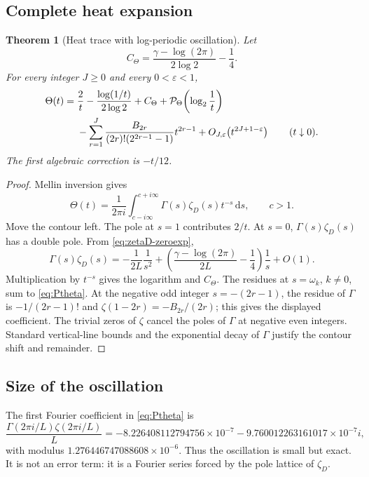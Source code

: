 \documentclass[11pt,oneside]{article}
\numberwithin{equation}{section}
\theoremstyle{plain}
\newtheorem{theorem}{Theorem}[section]
\theoremstyle{definition}
\theoremstyle{remark}
\newcommand{\dd}{\,\mathrm{d}}
\newcommand{\Pcal}{\mathcal P}
\begin{document}
\subsection{Complete heat expansion}

\begin{theorem}[Heat trace with log-periodic oscillation]\label{thm:heat}
Let
\begin{equation}\label{eq:Ctheta}
 C_\Theta=\frac{\gamma-\log(2\pi)}{2\log2}-\frac14.
\end{equation}
For every integer $J\ge0$ and every $0<\varepsilon<1$,
\begin{align}\label{eq:heat-asymp}
 \Theta(t)
 ={}&\frac2t-\frac{\log(1/t)}{2\log2}+C_\Theta
 +\Pcal_\Theta\!\left(\log_2\frac1t\right)\\
 &-\sum_{r=1}^{J}
 \frac{B_{2r}}{(2r)!(2^{2r-1}-1)}t^{2r-1}
 +O_{J,\varepsilon}\!\left(t^{2J+1-\varepsilon}\right)
 \qquad(t\downarrow0).\notag
\end{align}
The first algebraic correction is $-t/12$.
\end{theorem}

\begin{proof}
Mellin inversion gives
\[
 \Theta(t)=\frac1{2\pi i}\int_{c-i\infty}^{c+i\infty}
 \Gamma(s)\zeta_D(s)t^{-s}\dd s,
 \qquad c>1.
\]
Move the contour left.  The pole at $s=1$ contributes $2/t$.  At $s=0$, $\Gamma(s)\zeta_D(s)$ has a double pole.  From \cref{eq:zetaD-zeroexp},
\[
 \Gamma(s)\zeta_D(s)
 =-\frac1{2L}\frac1{s^2}
 +\left(\frac{\gamma-\log(2\pi)}{2L}-\frac14\right)\frac1s+O(1).
\]
Multiplication by $t^{-s}$ gives the logarithm and $C_\Theta$.  The residues at $s=\omega_k$, $k\ne0$, sum to \cref{eq:Ptheta}.  At the negative odd integer $s=-(2r-1)$, the residue of $\Gamma$ is $-1/(2r-1)!$ and $\zeta(1-2r)=-B_{2r}/(2r)$; this gives the displayed coefficient.  The trivial zeros of $\zeta$ cancel the poles of $\Gamma$ at negative even integers.  Standard vertical-line bounds and the exponential decay of $\Gamma$ justify the contour shift and remainder.
\end{proof}

\subsection{Size of the oscillation}

The first Fourier coefficient in \cref{eq:Ptheta} is
\begin{equation}\label{eq:Pfirst}
 \frac{\Gamma(2\pi i/L)\zeta(2\pi i/L)}L
 =-8.226408112794756\times10^{-7}
  -9.760012263161017\times10^{-7}i,
\end{equation}
with modulus $1.276446747088608\times10^{-6}$.  Thus the oscillation is small but exact.  It is not an error term: it is a Fourier series forced by the pole lattice of $\zeta_D$.
\end{document}
